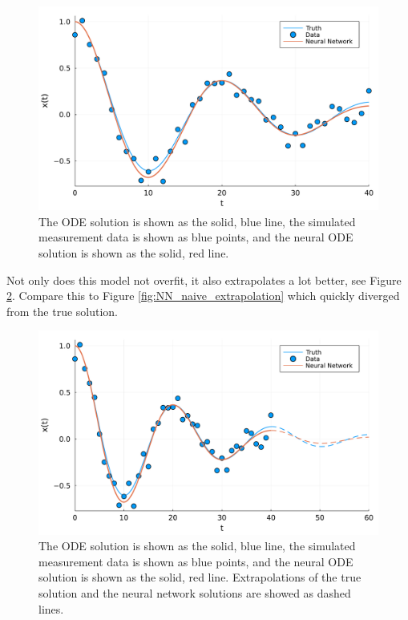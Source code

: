 \documentclass[10pt,a4paper]{article}
\begin{document}
\begin{figure}[H]
    \includegraphics[width=\linewidth]{with_ode.pdf}
    \caption{The ODE solution is shown as the solid, blue line,
        the simulated measurement data is shown as blue points,
        and the neural ODE solution is shown as the solid, red line.}
    \label{fig:NN_ODE}
\end{figure}

Not only does this model not overfit, it also extrapolates a lot better, see Figure \ref{fig:NN_ODE_extrapolation}.
Compare this to Figure \ref{fig:NN_naive_extrapolation} which quickly diverged from the true solution.

\begin{figure}[H]
    \includegraphics[width=\linewidth]{with_ode_extrapolated.pdf}
    \caption{The ODE solution is shown as the solid, blue line,
        the simulated measurement data is shown as blue points,
        and the neural ODE solution is shown as the solid, red line.
        Extrapolations of the true solution and the neural network solutions are showed as dashed lines.}
    \label{fig:NN_ODE_extrapolation}
\end{figure}
\end{document}
